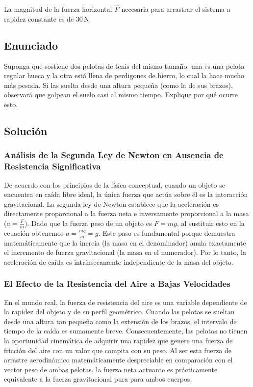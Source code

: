 \documentclass[12pt]{article}
\begin{document}
La magnitud de la fuerza horizontal $\vec{F}$ necesaria para arrastrar el sistema a rapidez constante es de $30 \, \text{N}$.

\newpage

\subsection*{Enunciado}
Suponga que sostiene dos pelotas de tenis del mismo tamaño: una es una pelota regular hueca y la otra está llena de perdigones de hierro, lo cual la hace mucho más pesada. Si las suelta desde una altura pequeña (como la de sus brazos), observará que golpean el suelo casi al mismo tiempo. Explique por qué ocurre esto.

\subsection*{Solución}

\subsubsection*{Análisis de la Segunda Ley de Newton en Ausencia de Resistencia Significativa}
De acuerdo con los principios de la física conceptual, cuando un objeto se encuentra en caída libre ideal, la única fuerza que actúa sobre él es la interacción gravitacional. La segunda ley de Newton establece que la aceleración es directamente proporcional a la fuerza neta e inversamente proporcional a la masa ($a = \frac{F}{m}$). Dado que la fuerza peso de un objeto es $F = mg$, al sustituir esto en la ecuación obtenemos $a = \frac{mg}{m} = g$. Este paso es fundamental porque demuestra matemáticamente que la inercia (la masa en el denominador) anula exactamente el incremento de fuerza gravitacional (la masa en el numerador). Por lo tanto, la aceleración de caída es intrínsecamente independiente de la masa del objeto.

\subsubsection*{El Efecto de la Resistencia del Aire a Bajas Velocidades}
En el mundo real, la fuerza de resistencia del aire es una variable dependiente de la rapidez del objeto y de su perfil geométrico. Cuando las pelotas se sueltan desde una altura tan pequeña como la extensión de los brazos, el intervalo de tiempo de la caída es sumamente breve. Consecuentemente, las pelotas no tienen la oportunidad cinemática de adquirir una rapidez que genere una fuerza de fricción del aire con un valor que compita con su peso. Al ser esta fuerza de arrastre aerodinámico matemáticamente despreciable en comparación con el vector peso de ambas pelotas, la fuerza neta actuante es prácticamente equivalente a la fuerza gravitacional pura para ambos cuerpos.
\end{document}
